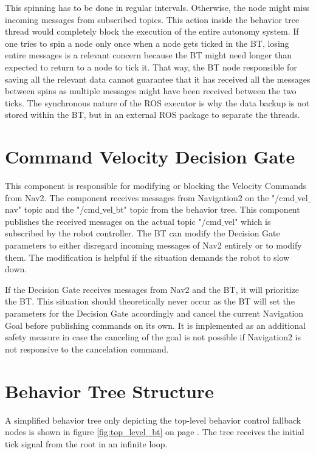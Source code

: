 This spinning has to be done in regular intervals. Otherwise, the node might miss incoming messages from subscribed topics. This action inside the behavior tree thread would completely block the execution of the entire autonomy system. If one tries to spin a node only once when a node gets ticked in the BT, losing entire messages is a relevant concern because the BT might need longer than expected to return to a node to tick it. That way, the BT node responsible for saving all the relevant data cannot guarantee that it has received all the messages between spins as multiple messages might have been received between the two ticks. The synchronous nature of the ROS executor is why the data backup is not stored within the BT, but in an external ROS package to separate the threads.

\section{Command Velocity Decision Gate}

This component is responsible for modifying or blocking the Velocity Commands from Nav2. The component receives messages from Navigation2 on the "/cmd$\_$vel$\_$nav" topic and the "/cmd$\_$vel$\_$bt" topic from the behavior tree. This component publishes the received messages on the actual topic "/cmd$\_$vel" which is subscribed by the robot controller. The BT can modify the Decision Gate parameters to either disregard incoming messages of Nav2 entirely or to modify them. The modification is helpful if the situation demands the robot to slow down. 

If the Decision Gate receives messages from Nav2 and the BT, it will prioritize the BT. This situation should theoretically never occur as the BT will set the parameters for the Decision Gate accordingly and cancel the current Navigation Goal before publishing commands on its own. It is implemented as an additional safety measure in case the canceling of the goal is not possible if Navigation2 is not responsive to the cancelation command. 

\section{Behavior Tree Structure}

A simplified behavior tree only depicting the top-level behavior control fallback nodes is shown in figure \ref{fig:top_level_bt} on page \pageref{fig:top_level_bt}. The tree receives the initial tick signal from the root in an infinite loop. 

